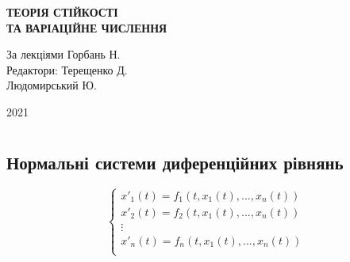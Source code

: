 \documentclass[14pt,a4paper]{scrartcl}
\theoremstyle{definition}
\newtheorem*{defo}{Означення}
\theoremstyle{definition}
\theoremstyle{definition}
\begin{document}
\def\ty{\tilde{y}}
\def\sh{\mathrm{sh}}
\def\ch{\mathrm{ch}}

\def\be{\begin{equation}}
\def\ee{\end{equation}}

\def\bd{\begin{defo}}
\def\ed{\end{defo}}

\def\bbt{\begin{boxteo}}
\def\ebt{\end{boxteo}}

\def\i{\infty}
\def\d{\partial}

\def\vx{\overrightarrow{x}}
\def\vphi{\overrightarrow{\varphi}}
\def\vf{\overrightarrow{f}}
\def\vline{\bigg|}
\def\tvy{\vec{\tilde{y}}}

\begin{titlepage}
\begin{center}

\vspace*{0.1cm}
\vfill

\begin{spacing}{3}
  {\huge \textbf{ТЕОРІЯ СТІЙКОСТІ \\ ТА ВАРІАЦІЙНЕ ЧИСЛЕННЯ}}\\
\end{spacing}
\vspace{5cm}
За лекціями Горбань Н.\\
\vspace{1cm}
Редактори: Терещенко Д.\\ \hspace{3.7cm} Людомирський Ю.

\vfill

2021

\end{center}
\end{titlepage}


\tableofcontents
\newpage

\section{}
\subsection{Нормальні системи диференційних рівнянь}


\be \label{nsde1}
\left\lbrace
\begin{gathered}
    x'_1 (t) = f_1(t, x_1 (t), ... , x_n(t)) \\
    x'_2 (t) = f_2(t, x_1 (t), ... , x_n(t)) \\
    \vdots \\
    x'_n (t) = f_n(t, x_1 (t), ... , x_n(t)) \\
\end{gathered}\right.
\ee
\end{document}

